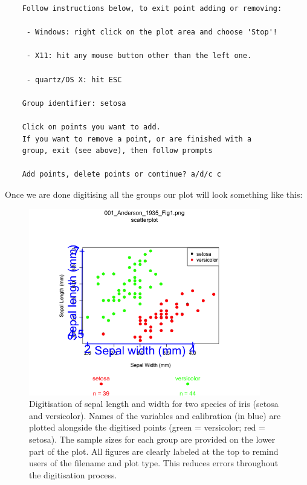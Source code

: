 \documentclass{article}
\begin{document}
\begin{lstlisting}
	Follow instructions below, to exit point adding or removing:

	 - Windows: right click on the plot area and choose 'Stop'!

	 - X11: hit any mouse button other than the left one.

	 - quartz/OS X: hit ESC

	Group identifier: setosa

	Click on points you want to add.
	If you want to remove a point, or are finished with a
	group, exit (see above), then follow prompts

	Add points, delete points or continue? a/d/c c

\end{lstlisting}

Once we are done digitising all the groups our plot will look something like this:

\begin{figure}[!h] 
 \includegraphics[width=0.9\textwidth]{001_Anderson_1935_Fig1_digitised.png} 
 \caption{Digitisation of sepal length and width for two species of iris (setosa and versicolor). Names of the variables and calibration (in blue) are plotted alongside the digitised points (green = versicolor; red = setosa). The sample sizes for each group are provided on the lower part of the plot. All figures are clearly labeled at the top to remind users of the filename and plot type. This reduces errors throughout the digitisation process.}
\label{fig:rotate}
\end{figure}
\end{document}
